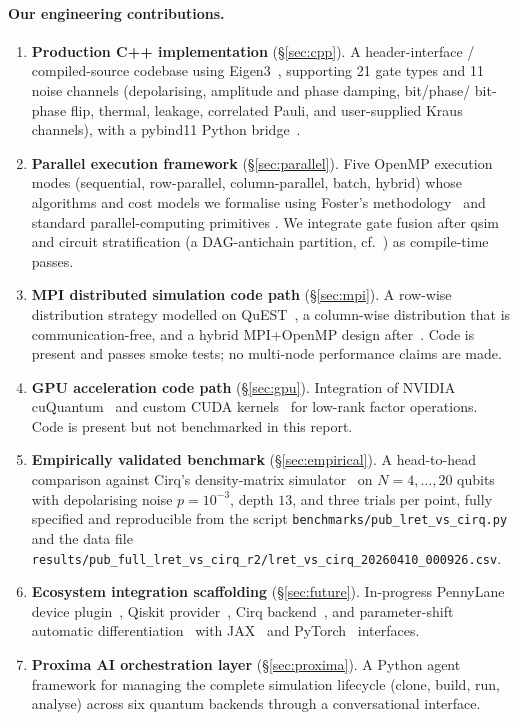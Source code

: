 \documentclass[11pt,a4paper]{article}
\begin{document}
\paragraph{Our engineering contributions.}
\begin{enumerate}
  \item \textbf{Production C++ implementation} (\S\ref{sec:cpp}). A header-interface /
        compiled-source codebase using Eigen3~\cite{eigen2010}, supporting 21 gate types
        and 11 noise channels (depolarising, amplitude and phase damping, bit/phase/
        bit-phase flip, thermal, leakage, correlated Pauli, and user-supplied Kraus
        channels), with a pybind11 Python bridge~\cite{pybind11}.
  \item \textbf{Parallel execution framework} (\S\ref{sec:parallel}). Five OpenMP
        execution modes (sequential, row-parallel, column-parallel, batch, hybrid)
        whose algorithms and cost models we formalise using Foster's
        methodology~\cite{foster1995} and standard parallel-computing primitives
        \cite{wilkinson2005,dagummenon1998}. We integrate gate fusion after
        qsim~\cite{qsim} and circuit stratification (a DAG-antichain partition, cf.\
        \cite{cormen2009}) as compile-time passes.
  \item \textbf{MPI distributed simulation code path} (\S\ref{sec:mpi}). A row-wise
        distribution strategy modelled on QuEST~\cite{jones2019quest}, a column-wise
        distribution that is communication-free, and a hybrid MPI+OpenMP design
        after~\cite{rabenseifner2009}. Code is present and passes smoke tests; no
        multi-node performance claims are made.
  \item \textbf{GPU acceleration code path} (\S\ref{sec:gpu}). Integration of
        NVIDIA cuQuantum~\cite{bayraktar2023cuquantum} and custom CUDA
        kernels~\cite{nickolls2008cuda} for low-rank factor operations. Code is present
        but not benchmarked in this report.
  \item \textbf{Empirically validated benchmark} (\S\ref{sec:empirical}). A head-to-head
        comparison against Cirq's density-matrix simulator~\cite{cirq} on $N=4,\ldots,20$
        qubits with depolarising noise $p=10^{-3}$, depth $13$, and three trials per
        point, fully specified and reproducible from the script
        \nolinkurl{benchmarks/pub_lret_vs_cirq.py} and the data file
        \nolinkurl{results/pub_full_lret_vs_cirq_r2/lret_vs_cirq_20260410_000926.csv}.
  \item \textbf{Ecosystem integration scaffolding} (\S\ref{sec:future}). In-progress
        PennyLane device plugin~\cite{bergholm2018pennylane}, Qiskit
        provider~\cite{javadi2024qiskit}, Cirq backend~\cite{cirq}, and parameter-shift
        automatic differentiation~\cite{mitarai2018,schuld2019} with JAX~\cite{jax} and
        PyTorch~\cite{paszke2019pytorch} interfaces.
  \item \textbf{Proxima AI orchestration layer} (\S\ref{sec:proxima}). A Python agent
        framework for managing the complete simulation lifecycle (clone, build, run,
        analyse) across six quantum backends through a conversational interface.
\end{enumerate}
\end{document}
